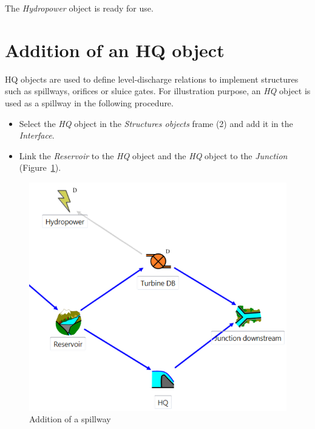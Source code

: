 \documentclass[
  letterpaper,
  DIV=11,
  numbers=noendperiod]{scrreprt}
\begin{document}
The \emph{Hydropower} object is ready for use.

\hypertarget{addition-of-an-hq-object}{%
\section{Addition of an HQ object}\label{addition-of-an-hq-object}}

HQ objects are used to define level-discharge relations to implement
structures such as spillways, orifices or sluice gates. For illustration
purpose, an \emph{HQ} object is used as a spillway in the following
procedure.

\begin{itemize}
\item
  Select the \emph{HQ} object in the \emph{Structures objects} frame (2)
  and add it in the \emph{Interface}.
\item
  Link the \emph{Reservoir} to the \emph{HQ} object and the \emph{HQ}
  object to the \emph{Junction} (Figure~\ref{fig-addition_spillway}).
\end{itemize}

\begin{figure}

{\centering \includegraphics{./figures/fig-addition_spillway.png}

}

\caption{\label{fig-addition_spillway}Addition of a spillway}

\end{figure}
\end{document}

